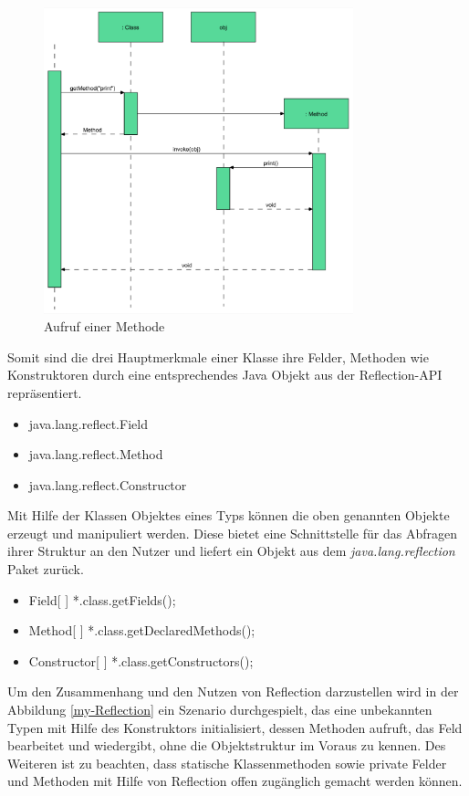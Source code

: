   \begin{figure}[h!]
    \centering
    \includegraphics[width=0.8\textwidth]{material/images/reflection-flussdiagram.png}
    \caption{Aufruf einer Methode}
    \label{fig:reflection-fluss}
  \end{figure}

  \newpage Somit sind die drei Hauptmerkmale einer Klasse ihre Felder, Methoden wie Konstruktoren durch eine entsprechendes Java Objekt aus der Reflection-API repräsentiert. 
  \begin{itemize}
    \item java.lang.reflect.Field
    \item java.lang.reflect.Method
    \item java.lang.reflect.Constructor
  \end{itemize}
  Mit Hilfe der Klassen Objektes eines Typs können die oben genannten Objekte erzeugt und manipuliert werden. Diese bietet eine Schnittstelle für das Abfragen ihrer Struktur an den Nutzer und liefert ein Objekt aus dem \textit{java.lang.reflection} Paket zurück.
  \begin{itemize}
    \item Field[ ] *.class.getFields();
    \item Method[ ] *.class.getDeclaredMethods();
    \item Constructor[ ] *.class.getConstructors();
  \end{itemize}
  \bigbreak 

  Um den Zusammenhang und den Nutzen von Reflection darzustellen wird in der Abbildung \ref{my-Reflection} ein Szenario durchgespielt, das eine unbekannten Typen mit Hilfe des Konstruktors initialisiert, dessen Methoden aufruft, das Feld bearbeitet und wiedergibt, ohne die Objektstruktur im Voraus zu kennen. Des Weiteren ist zu beachten, dass statische Klassenmethoden sowie private Felder und Methoden mit Hilfe von Reflection offen zugänglich gemacht werden können.\bigbreak 

